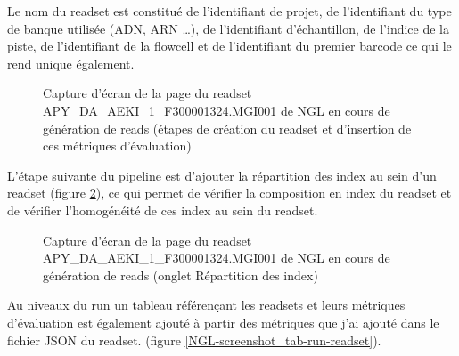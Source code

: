 Le nom du readset est constitué de l'identifiant de projet, de l'identifiant du type de banque utilisée (ADN, ARN \dots), de l'identifiant d'échantillon, de l'indice de la piste, de l'identifiant de la flowcell et de l'identifiant du premier barcode ce qui le rend unique également.

\begin{figure}[H]
    \centering
    \caption{\footnotesize{Capture d'écran de la page du readset APY\_DA\_AEKI\_1\_F300001324.MGI001 de NGL en cours de génération de reads (étapes de création du readset et d'insertion de ces métriques d'évaluation)}}
    \label{NGL-screenshot_readset}
\end{figure}

L'étape suivante du pipeline est d'ajouter la répartition des index au sein d'un readset (figure \ref{NGL-screenshot_readset-index}), ce qui permet de vérifier la composition en index du readset et de vérifier l'homogénéité de ces index au sein du readset.

\begin{figure}[H]
    \centering
    \caption{\footnotesize{Capture d'écran de la page du readset APY\_DA\_AEKI\_1\_F300001324.MGI001 de NGL en cours de génération de reads (onglet \og Répartition des index\fg{})}}
    \label{NGL-screenshot_readset-index}
\end{figure}

Au niveaux du run un tableau référençant les readsets et leurs métriques d'évaluation est également ajouté à partir des métriques que j'ai ajouté dans le fichier JSON du readset. (figure \ref{NGL-screenshot_tab-run-readset}).

